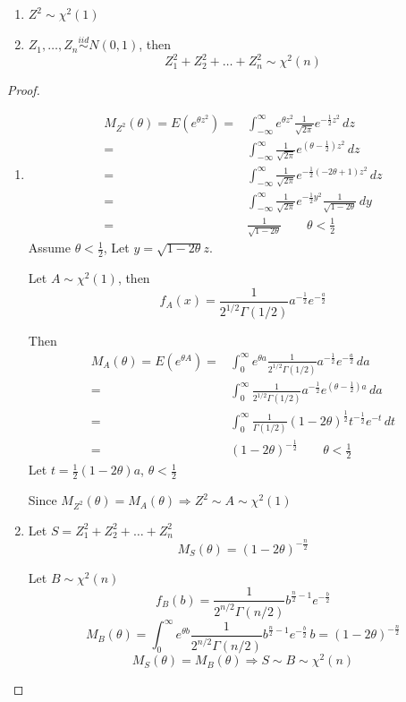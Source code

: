 \begin{exmp}
\begin{enumerate}
\item $Z^2 \sim \chi^2(1)$
\item $Z_1,\dots,Z_n \overset{iid}{\sim} N(0,1)$, then 
\[Z_1^2 +Z_2^2+\dots+Z_n^2 \sim \chi^2(n)\] 
\end{enumerate}
\begin{proof}
\begin{enumerate}
\item \begin{align*}
M_{Z^2}(\theta)=E(e^{\theta z^2}) = & \int_{-\infty}^\infty e^{\theta z^2} \frac{1}{\sqrt{2 \pi}} e^{-\frac{1}{2} z^2} \, dz \\
= & \int_{-\infty}^\infty \frac{1}{\sqrt{2 \pi}} e^{\left(\theta-\frac{1}{2}\right) z^2} \,dz \\
= & \int_{-\infty}^\infty  \frac{1}{\sqrt{2 \pi}} e^{-\frac{1}{2}\left(-2\theta+1\right) z^2} \,dz \\
= & \int_{-\infty}^\infty  \frac{1}{\sqrt{2 \pi}} e^{-\frac{1}{2} y^2} \frac{1}{\sqrt{1-2\theta}} \,dy \\
= & \frac{1}{\sqrt{1-2\theta}} \qquad \theta<\frac{1}{2}
\end{align*}
Assume $\theta <\frac{1}{2}$, Let $y=\sqrt{1-2\theta} z$.

Let $A \sim \chi^2(1)$, then
\[f_A(x)=\frac{1}{2^{1/2} \Gamma(1/2)} a^{-\frac{1}{2}} e^{-\frac{a}{2}}	\]

Then
\begin{align*}
M_A(\theta)=E(e^{\theta A}) = & \int_0^\infty	e^{\theta a}\frac{1}{2^{1/2} \Gamma(1/2)} a^{-\frac{1}{2}} e^{-\frac{a}{2}}\,da	\\
= & \int_0^\infty \frac{1}{2^{1/2} \Gamma(1/2)}  a^{-\frac{1}{2}} e^{\left(\theta-\frac{1}{2}\right)a}\,da \\
= & \int_0^\infty \frac{1}{\Gamma(1/2)} (1-2\theta)^{\frac{1}{2}} t^{-\frac{1}{2}} e^{-t} \,dt	\\
= & (1-2\theta)^{-\frac{1}{2}}  \qquad \theta<\frac{1}{2}
\end{align*}
Let $t=\frac{1}{2} (1-2\theta)a$, $\theta<\frac{1}{2}$ 

Since $M_{Z^2}(\theta)=M_A(\theta) \Rightarrow Z^2\sim A\sim \chi^2(1)$
\item Let $S=Z_1^2 +Z_2^2+\dots+Z_n^2$
\[M_S(\theta)=(1-2\theta)^{-\frac{n}{2}}\]

Let $B \sim \chi^2(n)$
\[f_B(b)=\frac{1}{2^{n/2} \Gamma(n/2)} b^{\frac{n}{2}-1} e^{-\frac{b}{2}}	\]
\[M_B(\theta)= \int_0^\infty e^{\theta b}	\frac{1}{2^{n/2} \Gamma(n/2)} b^{\frac{n}{2}-1} e^{-\frac{b}{2}} \,b=(1-2\theta)^{-\frac{n}{2}}\]
\[M_S(\theta)=M_B(\theta) \Rightarrow S \sim B \sim \chi^2(n)\]
\end{enumerate}
\end{proof}
\end{exmp}

